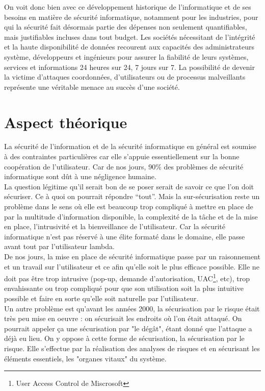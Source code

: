\documentclass[a4paper]{memoir}
\begin{document}
On voit donc bien avec ce développement historique de l'informatique et de ses besoins en matière de sécurité informatique, notamment pour les industries, pour qui la sécurité fait désormais partie des dépenses non seulement quantifiables, mais justifiables incluses dans tout budget. Les sociétés nécessitant de l'intégrité et la haute disponibilité de données recourent aux capacités des administrateurs système, développeurs et ingénieurs pour assurer la fiabilité de leurs systèmes, services et informations 24 heures sur 24, 7 jours sur 7. La possibilité de devenir la victime d'attaques coordonnées, d'utilisateurs ou de processus malveillants représente une véritable menace au succès d'une société. 

\chapter{Aspect théorique}
 

La sécurité de l'information et de la sécurité informatique en général est soumise à des contraintes particulières car elle s'appuie essentiellement sur la bonne coopération de l'utilisateur. Car de nos jours, 90\% des problèmes de sécurité informatique sont dût à une négligence humaine.\\
La question légitime qu'il serait bon de se poser serait de savoir ce que l'on doit sécuriser. Ce à quoi on pourrait répondre ``tout''. Mais la sur-sécurisation reste un problème dans le sens où elle est beaucoup trop compliqué à mettre en place de par la multitude d'information disponible, la complexité de la tâche et de la mise en place, l'intrusivité et la bienveillance de l'utilisateur. Car la sécurité informatique n'est pas réservé à une élite formaté dans le domaine, elle passe avant tout par l'utilisateur lambda.\\
De nos jours, la mise en place de sécurité informatique passe par un raisonnement et un travail sur l'utilisateur et ce afin qu'elle soit le plus efficace possible. Elle ne doit pas être trop intrusive (pop-up, demande d'autorisation, UAC\footnote{User Access Control de Miscrosoft}, etc), trop envahissante ou trop compliqué pour que son utilisation soit la plus intuitive possible et faire en sorte qu'elle soit naturelle par l'utilisateur.\\

Un autre problème est qu'avant les années 2000, la sécurisation par le risque était très peu mise en oeuvre : on sécurisait les endroits où l'on était attaqué. On pourrait appeler ça une sécurisation par "le dégât", étant donné que l'attaque a déjà eu lieu.
On y oppose à cette forme de sécurisation, la sécurisation par le risque. Elle s'effectue par la réalisation des analyses de risques et en sécurisant les éléments essentiels, les "organes vitaux" du système.
\end{document}
